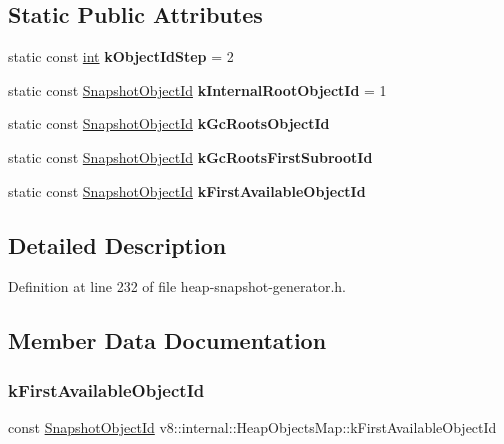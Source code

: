 \subsection*{Static Public Attributes}
\begin{DoxyCompactItemize}
\item 
\mbox{\label{classv8_1_1internal_1_1HeapObjectsMap_a11bef81d3f530538f97fc8dd362d2e2d}} 
static const \mbox{\hyperlink{classint}{int}} {\bfseries k\+Object\+Id\+Step} = 2
\item 
\mbox{\label{classv8_1_1internal_1_1HeapObjectsMap_a04fba906564af1ded2c829fe22b0f6d0}} 
static const \mbox{\hyperlink{classuint32__t}{Snapshot\+Object\+Id}} {\bfseries k\+Internal\+Root\+Object\+Id} = 1
\item 
static const \mbox{\hyperlink{classuint32__t}{Snapshot\+Object\+Id}} {\bfseries k\+Gc\+Roots\+Object\+Id}
\item 
static const \mbox{\hyperlink{classuint32__t}{Snapshot\+Object\+Id}} {\bfseries k\+Gc\+Roots\+First\+Subroot\+Id}
\item 
static const \mbox{\hyperlink{classuint32__t}{Snapshot\+Object\+Id}} {\bfseries k\+First\+Available\+Object\+Id}
\end{DoxyCompactItemize}


\subsection{Detailed Description}


Definition at line 232 of file heap-\/snapshot-\/generator.\+h.



\subsection{Member Data Documentation}
\mbox{\label{classv8_1_1internal_1_1HeapObjectsMap_a0424e15b8207599ea3fae3c69eb0fa26}} 
\subsubsection{\texorpdfstring{k\+First\+Available\+Object\+Id}{kFirstAvailableObjectId}}
{\footnotesize\ttfamily const \mbox{\hyperlink{classuint32__t}{Snapshot\+Object\+Id}} v8\+::internal\+::\+Heap\+Objects\+Map\+::k\+First\+Available\+Object\+Id\hspace{0.3cm}{\ttfamily [static]}}

